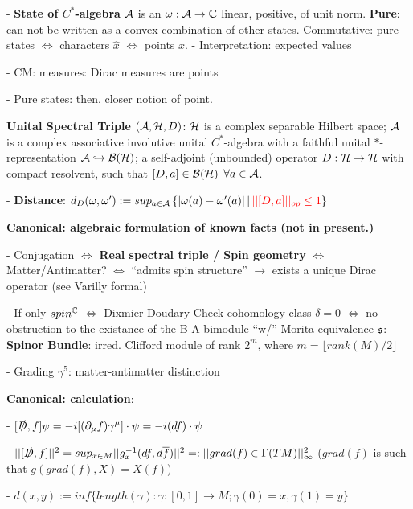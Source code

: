 {        - \textbf{State of $C^*$-algebra} $\mathcal A$ is an $\omega : \mathcal A \to \mathbb{C}$ linear, positive, of unit norm. \textbf{Pure}: can not be written as a convex combination of other states. Commutative: pure states $\Longleftrightarrow$ characters $\hat x$ $\Longleftrightarrow$ points $x$.
            \quad - Interpretation: expected values
            
            \quad - CM: measures: Dirac measures are points
            
            \quad - Pure states: then, closer notion of point.
            
            
        
        \textbf{Unital Spectral Triple} $(\mathcal A , \mathcal H, D)$: $\mathcal H$ is a complex separable Hilbert space; $\mathcal A$ is a complex associative involutive unital $C^*$-algebra with a faithful unital $*$-representation $\mathcal A \hookrightarrow \mathcal B(\mathcal H)$; a self-adjoint (unbounded) operator $D: \mathcal H \to \mathcal H$ with compact resolvent, such that $[D, a] \in \mathcal B(\mathcal H)$ $\forall a \in \mathcal A$.
        
        - \textbf{Distance}: $d_D(\omega, \omega') := sup_{a \in \mathcal A} \left\{|\omega(a) - \omega'(a)| \, | \, \textcolor{red}{||[D, a]||_{op} \leq 1} \right\}$
        
    
    \textbf{Canonical: algebraic formulation of known facts (not in present.)}
    
     - Conjugation $\iff$ \textbf{Real spectral triple / Spin geometry} $\iff$ Matter/Antimatter? $\iff$ ``admits spin structure'' $\to$ exists a unique Dirac operator (see Varilly formal)
     
     - If only $spin^{\mathbb{C}}$ $\iff$ Dixmier-Doudary Check cohomology class $\delta = 0$ $\iff$ no obstruction to the existance of the B-A bimodule ``w/'' Morita equivalence $\mathfrak{s}$: \textbf{Spinor Bundle}: irred. Clifford module of rank $2^m$, where $m = \lfloor rank(M)/2 \rfloor$
     
     - Grading $\gamma^5$: matter-antimatter distinction
    
    
    \textbf{Canonical: calculation}:
    
    - $[\slashed D, f]\psi = -i [(\partial_\mu f) \gamma^\mu] \cdot \psi = -i(df)\cdot \psi$
        
        - $||[\slashed D, f]||^2 = sup_{x \in M} ||g_x^{-1}(df, d \overline{f})||^2 =: ||grad(f) \in \Gamma(TM)||_\infty^2$ ($grad(f)$ is such that $g(grad(f), X) = X(f)$)
    
        - $d(x, y) := inf\{length(\gamma): \gamma:[0,1] \to M; \gamma(0) = x, \gamma(1) = y\}$
        
}
